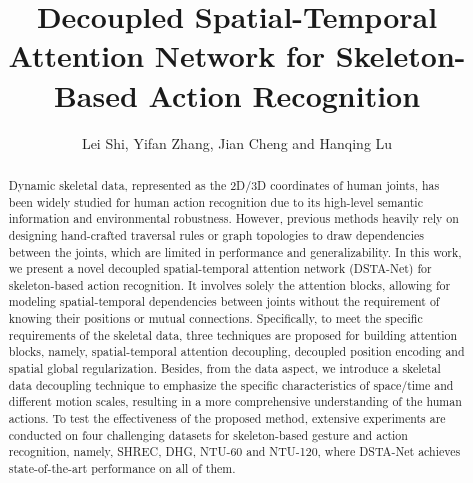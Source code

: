 \documentclass[runningheads]{llncs}
\begin{document}
\pagestyle{headings}
\mainmatter
\def\ECCVSubNumber{1018}  

\title{Decoupled Spatial-Temporal Attention Network for Skeleton-Based Action Recognition} 

\begin{comment}
\titlerunning{ECCV-20 submission ID \ECCVSubNumber} 
\authorrunning{ECCV-20 submission ID \ECCVSubNumber} 
\author{Anonymous ECCV submission}
\institute{Paper ID \ECCVSubNumber}
\end{comment}



\author{Lei Shi, Yifan Zhang, Jian Cheng and Hanqing Lu}
\maketitle


\begin{abstract}
Dynamic skeletal data, represented as the 2D/3D coordinates of human joints, has been widely studied for human action recognition due to its high-level semantic information and environmental robustness. 
However, previous methods heavily rely on designing hand-crafted traversal rules or graph topologies to draw dependencies between the joints, which are limited in performance and generalizability. 
In this work, we present a novel decoupled spatial-temporal attention network (DSTA-Net) for skeleton-based action recognition.  
It involves solely the attention blocks, allowing for modeling spatial-temporal dependencies between joints without the requirement of knowing their positions or mutual connections. 
Specifically, to meet the specific requirements of the skeletal data, 
three techniques are proposed for building attention blocks,
namely, spatial-temporal attention decoupling, decoupled position encoding and spatial global regularization. 
Besides, from the data aspect, we introduce a skeletal data decoupling technique to emphasize the specific characteristics of space/time and different motion scales, 
resulting in a more comprehensive understanding of the human actions.
To test the effectiveness of the proposed method, extensive experiments are conducted on four challenging datasets for skeleton-based gesture and action recognition, namely, SHREC, DHG, NTU-60 and NTU-120, where DSTA-Net achieves state-of-the-art performance on all of them. 

\end{abstract}   
\end{document}
